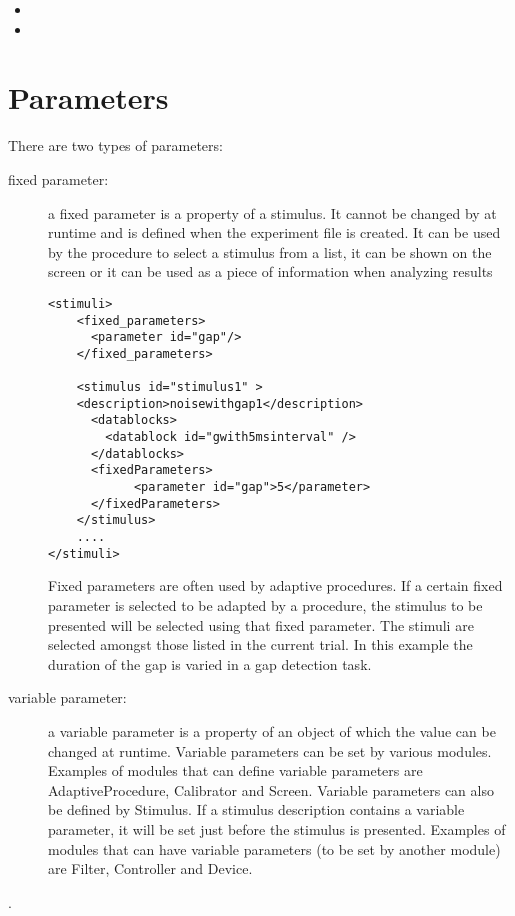 \label{sec:General}
\begin{itemize}
\item {}

\item {}
\end{itemize}

\section{Parameters}

There are two types of parameters:
\begin{description}

\item [fixed parameter:] a fixed parameter is a property of a
stimulus. It cannot be changed by \apex at runtime and is defined
when the experiment file is created. It can be used by the
procedure to select a stimulus from a list, it can be shown on the
screen or it can be used as a piece of information when analyzing
results

\begin{lstlisting}
<stimuli>
    <fixed_parameters>
      <parameter id="gap"/>
    </fixed_parameters>

    <stimulus id="stimulus1" >
    <description>noisewithgap1</description>
      <datablocks>
        <datablock id="gwith5msinterval" />
      </datablocks>
      <fixedParameters>
            <parameter id="gap">5</parameter>
      </fixedParameters>
    </stimulus>
    ....
</stimuli>
\end{lstlisting}

Fixed parameters are often used by adaptive procedures. If a
certain fixed parameter is selected to be adapted by a procedure,
the stimulus to be presented will be selected using that fixed
parameter. The stimuli are selected amongst those listed in the
current trial. In this example the duration of the gap is varied
in a gap detection task.

 \item [variable parameter:] a variable parameter is a
property of an object of which the value can be changed at
runtime. Variable parameters can be set by various \apex modules.
Examples of modules that can define variable parameters are
AdaptiveProcedure, Calibrator and Screen. Variable parameters can
also be defined by Stimulus. If a stimulus description contains a
variable parameter, it will be set just before the stimulus is
presented. Examples of modules that can have variable parameters
(to be set by another module) are Filter, Controller and Device.
\end{description}.

